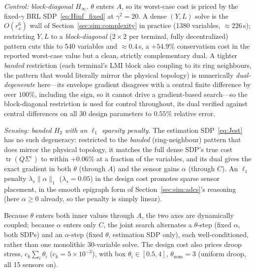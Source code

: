 \documentclass[twocolumn,amsthm]{autart}
\begin{document}
\emph{Control: block-diagonal $H_\infty$.} $\theta$ enters $A$, so its
worst-case cost is priced by the fixed-$\gamma$ BRL SDP~\eqref{eq:Hinf_fixed}
at $\gamma^2=20$. A dense $(Y,L)$ solve is the $O(r_x^6)$ wall of
Section~\ref{sec:sim:complexity} in practice (1380 variables,
$\approx\!226\,$s); restricting $Y,L$ to a \emph{block-diagonal}
($2\times2$ per terminal, fully decentralized) pattern cuts this to 540
variables and $\approx\!0.4\,$s, a $+54.9\%$ conservatism cost in the reported
worst-case value but a clean, strictly complementary dual. A tighter
\emph{banded} restriction (each terminal's LMI block also coupling to its ring
neighbours, the pattern that would literally mirror the physical topology) is
numerically \emph{dual-degenerate} here---its envelope gradient disagrees with
a central finite difference by over $100\%$, including the sign, so it cannot
drive a gradient-based search---so the block-diagonal restriction is used for
control throughout, its dual verified against central differences on all 30
design parameters to $0.55\%$ relative error.

\emph{Sensing: banded $H_2$ with an $\ell_1$ sparsity penalty.} The estimation
SDP~\eqref{eq:Jest} has no such degeneracy: restricted to the \emph{banded}
(ring-neighbour) pattern that does mirror the physical topology, it matches
the full dense SDP's true cost $\operatorname{tr}(Q\Sigma^\varepsilon)$ to
within $+0.06\%$ at a fraction of the variables, and its dual gives the exact
gradient in both $\theta$ (through $A$) and the sensor gains $\alpha$ (through
$C$). An $\ell_1$ penalty $\lambda_s\lVert\alpha\rVert_1$ ($\lambda_s=0.05$)
in the design cost promotes sparse sensor placement, in the smooth epigraph
form of Section~\ref{sec:sim:adcs}'s reasoning (here $\alpha\ge0$ already, so
the penalty is simply linear).

Because $\theta$ enters both inner values through $A$, the two axes are
dynamically coupled; because $\alpha$ enters only $C$, the joint search
alternates a $\theta$-step (fixed $\alpha$, both SDPs) and an $\alpha$-step
(fixed $\theta$, estimation SDP only), each well-conditioned, rather than one
monolithic 30-variable solve. The design cost also prices droop stress,
$c_k\sum_i\theta_i$ ($c_k=5\times10^{-3}$), with box
$\theta_i\in[0.5,4]$, $\theta_{\mathrm{nom}}=3$ (uniform droop, all 15 sensors
on).
\end{document}
